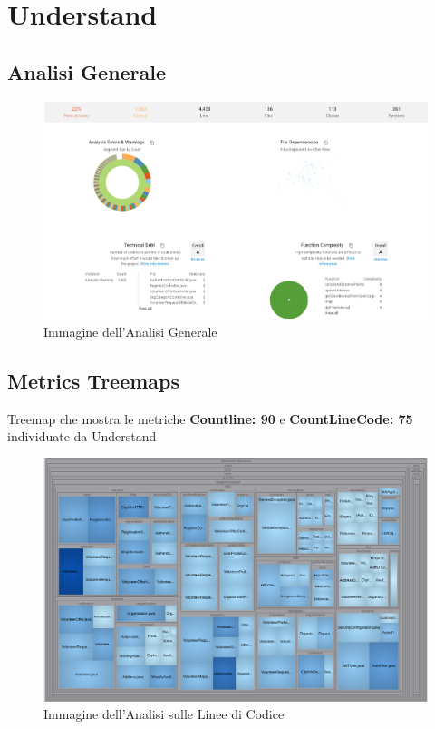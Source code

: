 \documentclass[12pt]{article}
\begin{document}
\section*{Understand}
\setcounter{subsection}{0} 
\renewcommand{\thesubsection}{\arabic{subsection}} 

\subsection{Analisi Generale}

\begin{figure}[H]
    \includegraphics[width=\textwidth, height=\textheight,keepaspectratio]{Immagini/Understand/Overall.png}
        \caption{Immagine dell'Analisi Generale}
        \label{fig:Understand1}
\end{figure}

\subsection{Metrics Treemaps}
Treemap che mostra le metriche \textbf{Countline: 90} e \textbf{CountLineCode: 75} individuate da Understand

\begin{figure}[H]
    \includegraphics[width=\textwidth, height=\textheight,keepaspectratio]{Immagini/Understand/Treemap.png}
        \caption{Immagine dell'Analisi sulle Linee di Codice}
        \label{fig:Understand2}
\end{figure}
\end{document}
